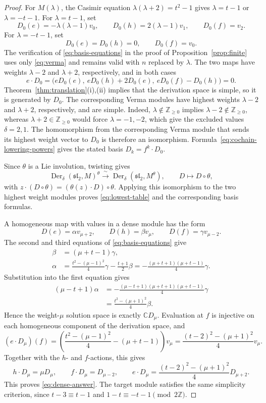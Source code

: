 \documentclass[11pt,reqno]{amsart}
\numberwithin{equation}{section}
\newcommand{\C}{\mathbb C}
\newcommand{\Z}{\mathbb Z}
\newcommand{\s}{\mathfrak{sl}_2}
\DeclareMathOperator{\Der}{Der}
\theoremstyle{definition}
\theoremstyle{remark}
\begin{document}
\begin{proof}
For \(M(\lambda)\), the Casimir equation
\(\lambda(\lambda+2)=t^2-1\) gives \(\lambda=t-1\) or
\(\lambda=-t-1\). For \(\lambda=t-1\), set
\[
D_0(e)=-\lambda(\lambda-1)v_0,\qquad
D_0(h)=2(\lambda-1)v_1,\qquad D_0(f)=v_2.
\]
For \(\lambda=-t-1\), set
\[
D_0(e)=D_0(h)=0,\qquad D_0(f)=v_0.
\]
The verification of \eqref{eq:basis-equations} in the proof of
Proposition~\ref{prop:finite} uses only \eqref{eq:verma} and remains
valid with \(n\) replaced by \(\lambda\).
The two maps have weights \(\lambda-2\) and \(\lambda+2\), respectively,
and in both cases
\[
e\cdot D_0=
\bigl(eD_0(e),\ eD_0(h)+2D_0(e),\ eD_0(f)-D_0(h)\bigr)=0.
\]
Theorem~\ref{thm:translation}(i),(ii) implies that the derivation
space is simple, so it is generated by \(D_0\).
The corresponding Verma modules have highest weights \(\lambda-2\)
and \(\lambda+2\), respectively, and are simple. Indeed,
\(\lambda\notin\Z_{\ge0}\) implies
\(\lambda-2\notin\Z_{\ge0}\), whereas
\(\lambda+2\in\Z_{\ge0}\) would force \(\lambda=-1,-2\),
which give the excluded values \(\delta=2,1\).
The homomorphism from the corresponding Verma module that sends
its highest weight vector to \(D_0\) is therefore an isomorphism.
Formula~\eqref{eq:cochain-lowering-powers} gives the stated basis
\(D_k=f^k\cdot D_0\).

Since \(\theta\) is a Lie involution, twisting gives
\[
\Der_\delta(\s,M)^\theta\xrightarrow{\ \sim\ }
\Der_\delta(\s,M^\theta),\qquad D\longmapsto D\circ\theta,
\]
with \(z\cdot(D\circ\theta)=(\theta(z)\cdot D)\circ\theta\).
Applying this isomorphism to the two highest weight modules proves
\eqref{eq:lowest-table} and the corresponding basis formulas.

A homogeneous map with values in a dense module has the form
\[
D(e)=\alpha v_{\mu+2},\qquad D(h)=\beta v_\mu,\qquad
D(f)=\gamma v_{\mu-2}.
\]
The second and third equations of \eqref{eq:basis-equations} give
\[
\begin{aligned}
\beta&=(\mu+t-1)\gamma,\\
\alpha&=\frac{t^2-(\mu-1)^2}{4}\gamma-\frac{t+1}{2}\beta
=-\frac{(\mu+t+1)(\mu+t-1)}{4}\gamma.
\end{aligned}
\]
Substitution into the first equation gives
\[
\begin{aligned}
(\mu-t+1)\alpha
&=-\frac{(\mu-t+1)(\mu+t+1)(\mu+t-1)}{4}\gamma\\
&=\frac{t^2-(\mu+1)^2}{4}\beta.
\end{aligned}
\]
Hence the weight-\(\mu\) solution space is exactly \(\C D_\mu\).
Evaluation at \(f\) is injective on each homogeneous component of the
derivation space, and
\[
(e\cdot D_\mu)(f)
=\left(\frac{t^2-(\mu-1)^2}{4}-(\mu+t-1)\right)v_\mu
=\frac{(t-2)^2-(\mu+1)^2}{4}v_\mu.
\]
Together with the \(h\)- and \(f\)-actions, this gives
\[
h\cdot D_\mu=\mu D_\mu,\qquad f\cdot D_\mu=D_{\mu-2},\qquad
e\cdot D_\mu=\frac{(t-2)^2-(\mu+1)^2}{4}D_{\mu+2}.
\]
This proves \eqref{eq:dense-answer}. The target module satisfies
the same simplicity criterion, since \(t-3\equiv t-1\) and
\(1-t\equiv-t-1\pmod{2\Z}\).
\end{proof}
\end{document}
